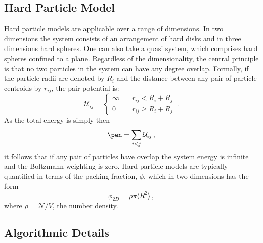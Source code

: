 \subsection{Hard Particle Model}

Hard particle models are applicable over a range of dimensions.
In two dimensions the system consists of an arrangement of hard disks and in three dimensions hard spheres.
One can also take a quasi \td{} system, which comprises hard spheres confined to a plane.
Regardless of the dimensionality, the central principle is that no two particles in the system can have any degree overlap.
Formally, if the particle radii are denoted by $R_i$ and the distance between any pair of particle centroids by $r_{ij}$, the pair potential is:
\begin{equation}
	\mathcal{U}_{ij} = \begin{cases}
	\infty \quad &r_{ij}<R_i+R_j \\
	0 \quad &r_{ij}\geq R_i+R_j 
	\end{cases} \,.
\end{equation}
As the total energy is simply then
\begin{equation}
	\pen = \sum_{i<j} \mathcal{U}_{ij}\,,
\end{equation}
it follows that if any pair of particles have overlap the system energy is infinite and the Boltzmann weighting is zero.
Hard particle models are typically quantified in terms of the packing fraction, $\phi$, which in two dimensions has the form
\begin{equation}
	\label{eq:packingfraction}
	\phi_{2D} = \rho\pi\langle R^2\rangle\,,
\end{equation}
where $\rho=\mathcal{N}/{V}$, the number density.

\subsection{Algorithmic Details} 

